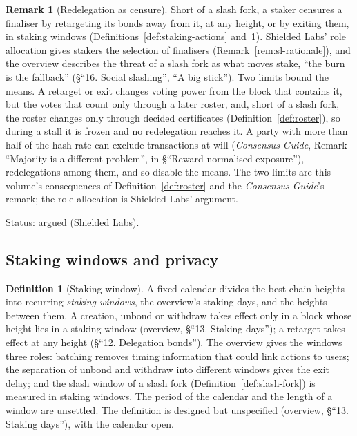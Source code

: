 \documentclass[11pt,a4paper]{article}
\theoremstyle{definition}
\newtheorem{definition}[theorem]{Definition}
\newtheorem{remark}[theorem]{Remark}
\begin{document}
\begin{remark}[Redelegation as censure]\label{rem:redelegation}
Short of a slash fork, a staker censures a finaliser by retargeting its
bonds away from it, at any height, or by exiting them, in staking windows
(Definitions~\ref{def:staking-actions} and~\ref{def:staking-window}). Shielded
Labs' role allocation gives stakers the selection of finalisers
(Remark~\ref{rem:sl-rationale}), and the overview describes the threat of a
slash fork as what moves stake, ``the burn is the fallback'' (\S``16. Social
slashing'', ``A big stick''). Two limits bound the means. A retarget or exit
changes voting power from the block that contains it, but the votes that count
only through a later roster, and, short of a slash fork, the roster changes
only through decided certificates (Definition~\ref{def:roster}), so during a
stall it is frozen and no redelegation reaches it. A party with more than
half of the hash
rate can exclude transactions at will (\emph{Consensus Guide}, Remark ``Majority
is a different problem'', in \S``Reward-normalised exposure''), redelegations
among them, and so disable the means. The two limits are this volume's
consequences of Definition~\ref{def:roster} and the \emph{Consensus Guide}'s
remark; the role allocation is Shielded Labs' argument.

Status: argued (Shielded Labs).
\end{remark}

\subsection{Staking windows and privacy}\label{sec:fs-windows}

\begin{definition}[Staking window]\label{def:staking-window}
A fixed calendar divides the best-chain heights into recurring \emph{staking
windows}, the overview's staking days, and the heights between them. A
creation, unbond or withdraw takes effect only in a block whose height lies
in a staking window (overview, \S``13. Staking days''); a retarget takes
effect at any height (\S``12. Delegation bonds''). The overview gives the
windows three roles: batching removes timing information
that could link actions to users; the separation of unbond and withdraw into
different windows gives the exit delay; and the slash window of a slash fork
(Definition~\ref{def:slash-fork}) is measured in staking windows. The period of
the calendar and the length of a window are unsettled. The definition is
designed but unspecified (overview, \S``13. Staking days''), with the calendar
open.
\end{definition}
\end{document}
